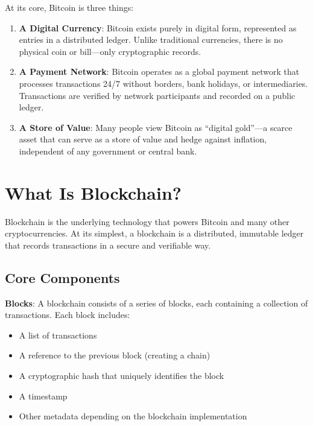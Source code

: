 At its core, Bitcoin is three things:

\begin{enumerate}
  \item \textbf{A Digital Currency}: Bitcoin exists purely in digital form, represented as entries in a distributed ledger. Unlike traditional currencies, there is no physical coin or bill---only cryptographic records.

  \item \textbf{A Payment Network}: Bitcoin operates as a global payment network that processes transactions 24/7 without borders, bank holidays, or intermediaries. Transactions are verified by network participants and recorded on a public ledger.

  \item \textbf{A Store of Value}: Many people view Bitcoin as ``digital gold''---a scarce asset that can serve as a store of value and hedge against inflation, independent of any government or central bank.
\end{enumerate}

\section{What Is Blockchain?}
\label{sec:what-is-blockchain}

Blockchain is the underlying technology that powers Bitcoin and many other cryptocurrencies. At its simplest, a blockchain is a distributed, immutable ledger that records transactions in a secure and verifiable way.

\subsection{Core Components}
\label{subsec:core-components}

\textbf{Blocks}: A blockchain consists of a series of blocks, each containing a collection of transactions. Each block includes:
\begin{itemize}
  \item A list of transactions
  \item A reference to the previous block (creating a chain)
  \item A cryptographic hash that uniquely identifies the block
  \item A timestamp
  \item Other metadata depending on the blockchain implementation
\end{itemize}

